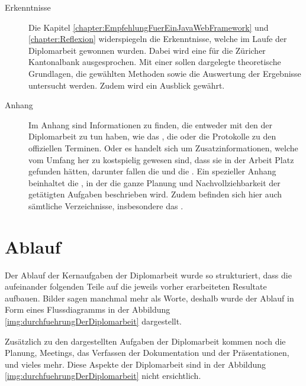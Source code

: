 \begin{description}
  \item[Erkenntnisse]
  
  Die Kapitel \ref{chapter:EmpfehlungFuerEinJavaWebFramework} und
  \ref{chapter:Reflexion} widerspiegeln die Erkenntnisse, welche im Laufe
  der Diplomarbeit gewonnen wurden. Dabei wird eine
   für die Züricher
  Kantonalbank ausgesprochen. Mit einer  sollen
  dargelegte theoretische Grundlagen, die gewählten Methoden sowie die
  Auswertung der Ergebnisse untersucht werden. Zudem wird ein Ausblick gewährt.
  
  \item[Anhang]
  
  Im Anhang sind Informationen zu finden, die entweder mit den
   der Diplomarbeit zu tun haben, wie das
  , die 
  oder die Protokolle zu den offiziellen Terminen. Oder es handelt sich um
  Zusatzinformationen, welche vom Umfang her zu kostspielig gewesen sind, dass
  sie in der Arbeit Platz gefunden hätten, darunter fallen die
   und die
  . Ein spezieller Anhang
  beinhaltet die , in der die ganze
  Planung und Nachvollziehbarkeit der getätigten Aufgaben beschrieben wird.
  Zudem befinden sich hier auch sämtliche Verzeichnisse, insbesondere das
  \bibname.
  
  \end{description}
  
  \section{Ablauf}

  Der Ablauf der Kernaufgaben der Diplomarbeit wurde so strukturiert, dass die
  aufeinander folgenden Teile auf die jeweils vorher erarbeiteten Resultate
  aufbauen. Bilder sagen manchmal mehr als Worte, deshalb wurde der Ablauf in
  Form eines Flussdiagramms in der Abbildung
  \ref{img:durchfuehrungDerDiplomarbeit} dargestellt.
  
  Zusätzlich zu den dargestellten Aufgaben der Diplomarbeit kommen noch
  die Planung, Meetings, das Verfassen der Dokumentation und der Präsentationen,
  und vieles mehr. Diese Aspekte der Diplomarbeit sind in der Abbildung
  \ref{img:durchfuehrungDerDiplomarbeit} nicht ersichtlich.
  \newline
  
